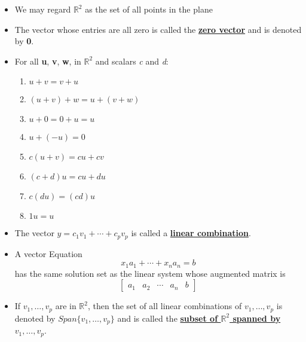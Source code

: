 \documentclass{article}
\newcommand{\definition}[1]{\underline{\textbf{#1}}}
\begin{document}
\begin{itemize}
  \item We may regard $\mathbb{R}^2$ as the set of all points in the plane
  
  \item The vector whose entries are all zero is called the \definition{zero vector} and is denoted by \textbf{0}.
  
  \item For all \textbf{u}, \textbf{v}, \textbf{w}, in $\mathbb{R}^2$ and scalars \textit{c} and \textit{d}:
  \begin{enumerate}
      \item $u + v = v + u$
      \item $(u + v) + w = u + (v + w)$
      \item $u + 0 = 0 + u = u$
      \item $u + (-u) = 0$
      \item $c(u + v) = cu + cv$
      \item $(c+d)u = cu + du$
      \item $c(du) = (cd)u$
      \item $1u = u$
  \end{enumerate}

  \item The vector $y = c_1v_1 + \cdots + c_pv_p$ is called a \definition{linear combination}.
  
  \item A vector Equation
  \begin{equation*}
      x_1a_1 + \cdots + x_na_n = b
  \end{equation*}
  has the same solution set as the linear system whose augmented matrix is
  \begin{equation*}
      \begin{bmatrix}
          a_1 & a_2 & \cdots & a_n & b
      \end{bmatrix}
  \end{equation*}

  \item If $v_1, \ldots, v_p$ are in $\mathbb{R}^2$, then the set of all linear combinations of $v_1, \ldots, v_p$ is denoted by
  $Span\{v_1, \ldots, v_p\}$ and is called the \definition{subset of $\mathbb{R}^2$ spanned by $v_1, \ldots, v_p$}.

\end{itemize}
\end{document}
